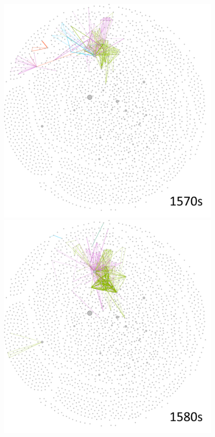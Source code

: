\documentclass[12pt,a4paper,oneside]{book}
\begin{document}
\begin{sloppypar}
\begin{figure}[H]
\includegraphics[scale=0.4]{graph/People_1570s.png}
\includegraphics[scale=0.4]{graph/People_1580s.png}

\end{figure}
\end{sloppypar}
\end{document}
